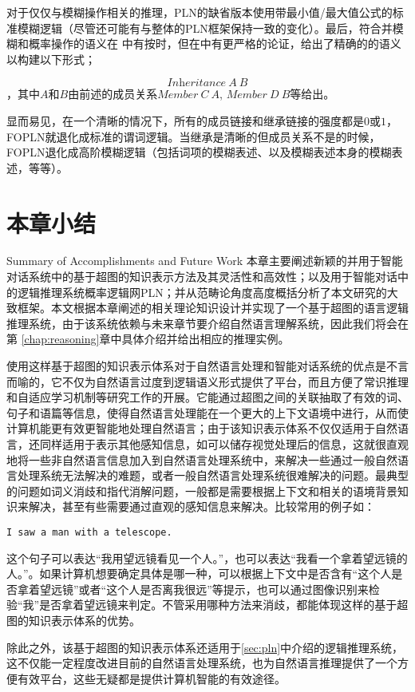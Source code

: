 对于仅仅与模糊操作相关的推理，PLN的缺省版本使用带最小值/最大值公式的标准模糊逻辑（尽管还可能有与整体的PLN框架保持一致的变化）。最后，符合并模糊和概率操作的语义在\cite{Goertzel2008} 中有按时，但在\cite{Goertzel2010e}中有更严格的论证，给出了精确的的语义以构建以下形式；

$$
\textit{Inheritance} \ A \  B
$$，其中$A$和$B$由前述的成员关系$\textit{Member}\ C\ A$, $\textit{Member}\ D\ B$等给出。

显而易见，在一个清晰的情况下，所有的成员链接和继承链接的强度都是$0$或$1$，FOPLN就退化成标准的谓词逻辑。当继承是清晰的但成员关系不是的时候，FOPLN退化成高阶模糊逻辑（包括词项的模糊表述、以及模糊表述本身的模糊表述，等等）。


\section{本章小结}{Summary of Accomplishments and Future Work}
本章主要阐述新颖的并用于智能对话系统中的基于超图的知识表示方法及其灵活性和高效性；以及用于智能对话中的逻辑推理系统概率逻辑网PLN；并从范畴论角度高度概括分析了本文研究的大致框架。本文根据本章阐述的相关理论知识设计并实现了一个基于超图的语言逻辑推理系统，由于该系统依赖与未来章节要介绍自然语言理解系统，因此我们将会在第 \ref{chap:reasoning}章中具体介绍并给出相应的推理实例。

使用这样基于超图的知识表示体系对于自然语言处理和智能对话系统的优点是不言而喻的，它不仅为自然语言过度到逻辑语义形式提供了平台，而且方便了常识推理和自适应学习机制等研究工作的开展。它能通过超图之间的关联抽取了有效的词、句子和语篇等信息，使得自然语言处理能在一个更大的上下文语境中进行，从而使计算机能更有效更智能地处理自然语言；由于该知识表示体系不仅仅适用于自然语言，还同样适用于表示其他感知信息，如可以储存视觉处理后的信息，这就很直观地将一些非自然语言信息加入到自然语言处理系统中，来解决一些通过一般自然语言处理系统无法解决的难题，或者一般自然语言处理系统很难解决的问题。最典型的问题如词义消歧和指代消解问题，一般都是需要根据上下文和相关的语境背景知识来解决，甚至有些需要通过直观的感知信息来解决。比较常用的例子如：

\begin{verbatim}
I saw a man with a telescope.
\end{verbatim}

这个句子可以表达“我用望远镜看见一个人。”，也可以表达“我看一个拿着望远镜的人。”。如果计算机想要确定具体是哪一种，可以根据上下文中是否含有“这个人是否拿着望远镜”或者“这个人是否离我很远”等提示，也可以通过图像识别来检验“我”是否拿着望远镜来判定。不管采用哪种方法来消歧，都能体现这样的基于超图的知识表示体系的优势。

除此之外，该基于超图的知识表示体系还适用于\ref{sec:pln}中介绍的逻辑推理系统，这不仅能一定程度改进目前的自然语言处理系统，也为自然语言推理提供了一个方便有效平台，这些无疑都是提供计算机智能的有效途径。
